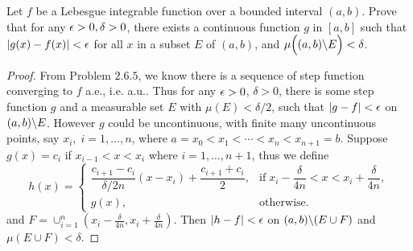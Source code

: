 \begin{pro}%
	Let $f$ be a Lebesgue integrable function over a bounded interval $(a,b)$. Prove that for any $\epsilon>0,\delta>0$, there exists a continuous function $g$ in $[a,b]$ such that $|g(x)-f(x)|<\epsilon$ for all $x$ in a subset $E$ of $(a,b)$, and $\mu\Big((a,b)\backslash E\Big)<\delta$.
\end{pro}
\begin{proof}
	From Problem $2.6.5$, we know there is a sequence of step function converging to $f$ a.e., i.e. a.u.. Thus for any $\epsilon>0$, $\delta>0$, there is some step function $g$ and a measurable set $E$ with $\mu(E)<\delta/2$, such that $|g-f|<\epsilon$ on $(a,b)\backslash E$. However  $g$ could be uncontinuous, with finite many uncontinuous points, say $x_i,\;i=1,\ldots,n$, where $a=x_0<x_1<\cdots<x_n<x_{n+1}=b$. Suppose $g(x)=c_i$ if $x_{i-1}<x<x_i$ where $i=1,\ldots,n+1$, thus we define
	\[h(x)=\begin{cases}
	\dfrac{c_{i+1}-c_i}{\delta/2n}(x-x_i)+\dfrac{c_{i+1}+c_i}{2},&\mbox{if}\;x_i-\dfrac{\delta}{4n}<x<x_i+\dfrac{\delta}{4n},\\ 
	g(x),&\mbox{otherwise}.\end{cases}\]
	 and $F=\cup_{i=1}^n (x_i-\frac{\delta}{4n},x_i+\frac{\delta}{4n})$. Then $|h-f|<\epsilon$ on $(a,b)\backslash(E\cup F)$ and $\mu(E\cup F)<\delta$.
\end{proof}

